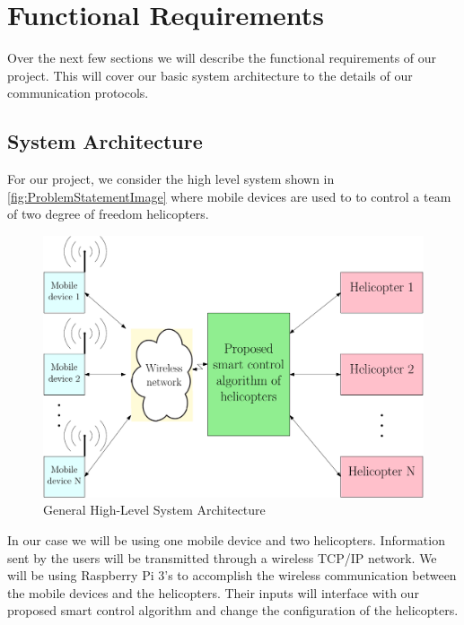\documentclass[letterpaper, 10pt, conference]{ieeeconf}
\begin{document}

\section{Functional Requirements}

Over the next few sections we will describe the functional requirements of our project.  This will cover our basic system architecture to the details of our communication protocols.

\subsection{System Architecture}
For our project, we consider the high level system shown in \autoref{fig:ProblemStatementImage} where mobile devices are used to to control a team of two degree of freedom helicopters. 
%
\begin{figure}
  \centering
  \begin{mdframed}[backgroundcolor=yellow!20, roundcorner=7pt,outerlinewidth=1.2pt,outerlinecolor=blue!50]
  \includegraphics[scale=0.31]{figs/ipe/ProblemStatementImage}
  \end{mdframed}
  \caption{General High-Level System Architecture}
  \label{fig:ProblemStatementImage}
\end{figure}
%
In our case we will be using one mobile device and two helicopters.  Information sent by the users will be transmitted through a wireless TCP/IP network.  We will be using Raspberry Pi 3's to accomplish the wireless communication between the mobile devices and the helicopters.  Their inputs will interface with our proposed smart control algorithm and change the configuration of the helicopters.
\end{document}
